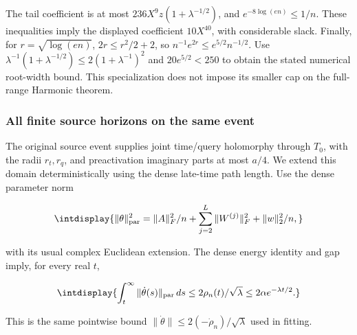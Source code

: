 
The tail coefficient is at most \(236X^9z(1+\lambda^{-1/2})\), and \(e^{-8\log(en)}\le1/n\). These inequalities imply the displayed coefficient \(10X^{40}\), with considerable slack. Finally, for \(r=\sqrt{\log(en)}\), \(2r\le r^2/2+2\), so \(n^{-1}e^{2r}\le e^{5/2}n^{-1/2}\). Use \(\lambda^{-1}(1+\lambda^{-1/2}) \le2(1+\lambda^{-1})^2\) and \(20e^{5/2}<250\) to obtain the stated numerical root-width bound. This specialization does not impose its smaller cap on the full-range Harmonic theorem.


\subsubsection{All finite source horizons on the same event}
\label{int:compact-analytic-extension-proof}
\label{int:harmonic-analytic-extension-proof}


The original source event supplies joint time/query holomorphy through \(T_0\), with the radii \(r_t,\allowbreak r_q\), and preactivation imaginary parts at most \(a/4\). We extend this domain deterministically using the dense late-time path length. Use the dense parameter norm


\begingroup\renewcommand{\theHequation}{intdisplay.627}
\begin{equation*}
\intdisplay{
\|\theta\|_{\rm par}^2=\|A\|_F^2/n+
                  \sum_{j=2}^L\|W^{(j)}\|_F^2+\|w\|_2^2/n,
}
\end{equation*}
\endgroup


with its usual complex Euclidean extension. The dense energy identity and gap imply, for every real \(t\),


\begingroup\renewcommand{\theHequation}{intdisplay.628}
\begin{equation}
\intdisplay{
\int_t^\infty\|\dot\theta(s)\|_{\rm par}\,ds
       \le2\rho_n(t)/\sqrt\lambda
       \le2\alpha e^{-\lambda t/2}.
}
\label{int:eq-0266-harmonic-late-dense-parameter-tail}
\end{equation}
\endgroup


This is the same pointwise bound \(\|\dot\theta\|\le2(-\dot\rho_n)/\sqrt\lambda\) used in fitting.


